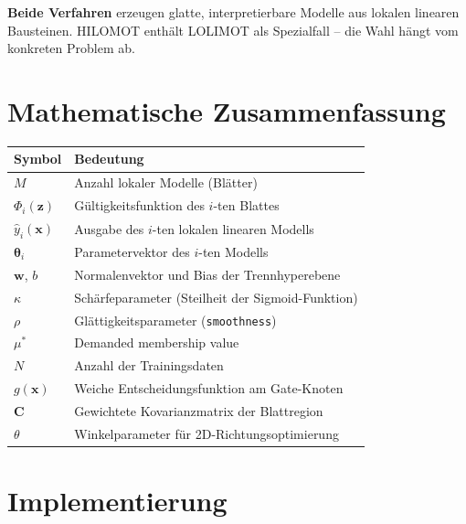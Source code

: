\documentclass[11pt,a4paper]{report}
\begin{document}
	\begin{merkbox}
		\textbf{Beide Verfahren} erzeugen glatte, interpretierbare Modelle aus lokalen linearen Bausteinen. HILOMOT enthält LOLIMOT als Spezialfall -- die Wahl hängt vom konkreten Problem ab.
	\end{merkbox}
	
	\section{Mathematische Zusammenfassung}
	
	\begin{center}
		\begin{tabular}{ll}
			\toprule
			\textbf{Symbol} & \textbf{Bedeutung} \\
			\midrule
			$M$ & Anzahl lokaler Modelle (Blätter) \\
			$\Phi_i(\mathbf{z})$ & Gültigkeitsfunktion des $i$-ten Blattes \\
			$\hat{y}_i(\mathbf{x})$ & Ausgabe des $i$-ten lokalen linearen Modells \\
			$\boldsymbol{\theta}_i$ & Parametervektor des $i$-ten Modells \\
			$\mathbf{w}$, $b$ & Normalenvektor und Bias der Trennhyperebene \\
			$\kappa$ & Schärfeparameter (Steilheit der Sigmoid-Funktion) \\
			$\rho$ & Glättigkeitsparameter (\texttt{smoothness}) \\
			$\mu^*$ & Demanded membership value \\
			$N$ & Anzahl der Trainingsdaten \\
			$g(\mathbf{x})$ & Weiche Entscheidungsfunktion am Gate-Knoten \\
			$\mathbf{C}$ & Gewichtete Kovarianzmatrix der Blattregion \\
			$\theta$ & Winkelparameter für 2D-Richtungsoptimierung \\
			\bottomrule
		\end{tabular}
	\end{center}
	
	\section{Implementierung}
	
\end{document}
